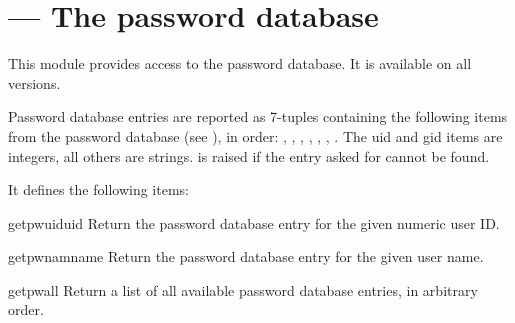 \section{ ---
         The password database}


This module provides access to the \UNIX{} password database.
It is available on all \UNIX{} versions.

Password database entries are reported as 7-tuples containing the
following items from the password database (see ), in order:
,
,
,
,
,
,
.
The uid and gid items are integers, all others are strings.
 is raised if the entry asked for cannot be found.

It defines the following items:

\begin{funcdesc}{getpwuid}{uid}
Return the password database entry for the given numeric user ID.
\end{funcdesc}

\begin{funcdesc}{getpwnam}{name}
Return the password database entry for the given user name.
\end{funcdesc}

\begin{funcdesc}{getpwall}{}
Return a list of all available password database entries, in arbitrary order.
\end{funcdesc}
